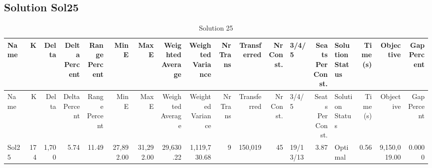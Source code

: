 \documentclass[a4paper]{article}
\begin{document}
\clearpage
\subsection{Solution Sol25}

{\scriptsize
\begin{longtable}{lrrrrrrrrrrrlrlrrr}
\caption{Solution 25}
\\ \toprule
Name &K &Delta &\shortstack{Delta\\Percent} &\shortstack{Range\\Percent} &Min E &Max E &\shortstack{Weighted\\Average} &\shortstack{Weighted\\Variance} &\shortstack{Nr\\Trans} &Transferred &\shortstack{Nr\\Const.} &3/4/5 &\shortstack{Seats\\Per\\Const.} &\shortstack{Solution\\Status} &\shortstack{Time\\(s)} &Objective &\shortstack{Gap\\Percent} \\ \midrule
\endfirsthead
\toprule
Name &K &Delta &\shortstack{Delta\\Percent} &\shortstack{Range\\Percent} &Min E &Max E &\shortstack{Weighted\\Average} &\shortstack{Weighted\\Variance} &\shortstack{Nr\\Trans} &Transferred &\shortstack{Nr\\Const.} &3/4/5 &\shortstack{Seats\\Per\\Const.} &\shortstack{Solution\\Status} &\shortstack{Time\\(s)} &Objective &\shortstack{Gap\\Percent} \\ \midrule
\endhead
\bottomrule
\endfoot
Sol25&174&1,700& 5.74&11.49&27,892.00&31,292.00&29,630.22&1,119,730.68&9&150,019&45&19/13/13& 3.87&Optimal& 0.56&9,150,019.00&0.0000\\ 
\end{longtable}

}
\end{document}
